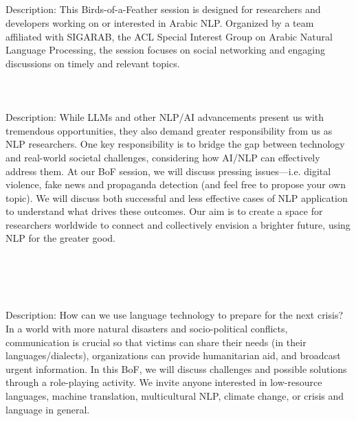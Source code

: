 \\  \vspace*{-0.1cm} \leavevmode\newline

 \\
\\
\\
Description: This Birds-of-a-Feather session is designed for researchers and developers working on or interested in Arabic NLP. Organized by a team affiliated with SIGARAB, the ACL Special Interest Group on Arabic Natural Language Processing, the session focuses on social networking and engaging discussions on timely and relevant topics.\\

\\
\\
\\
Description: While LLMs and other NLP/AI advancements present us with tremendous opportunities, they also demand greater responsibility from us as NLP researchers. One key responsibility is to bridge the gap between technology and real-world societal challenges, considering how AI/NLP can effectively address them. At our BoF session, we will discuss pressing issues---i.e. digital violence, fake news and propaganda detection (and feel free to propose your own topic). We will discuss both successful and less effective cases of NLP application to understand what drives these outcomes. Our aim is to create a space for researchers worldwide to connect and collectively envision a brighter future, using NLP for the greater good.\\

\\  \vspace*{-0.1cm} \leavevmode\newline

 \\
\\
\\
Description: How can we use language technology to prepare for the next crisis? In a world with more natural disasters and socio-political conflicts, communication is crucial so that victims can share their needs (in their languages/dialects), organizations can provide humanitarian aid, and broadcast urgent information. In this BoF, we will discuss challenges and possible solutions through a role-playing activity. We invite anyone interested in low-resource languages, machine translation, multicultural NLP, climate change, or crisis and language in general.\\

